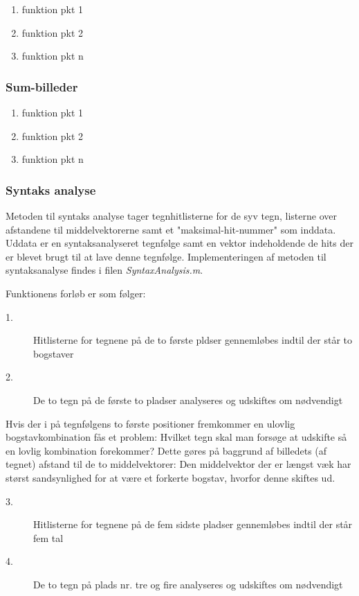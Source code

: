 \begin{enumerate}
\item funktion pkt 1
\item funktion pkt 2
\item funktion pkt n
\end{enumerate}

\subsubsection{Sum-billeder}

\begin{enumerate}
\item funktion pkt 1
\item funktion pkt 2
\item funktion pkt n
\end{enumerate}

\subsubsection{Syntaks analyse}

Metoden til syntaks analyse tager tegnhitlisterne for de syv tegn, listerne over afstandene til middelvektorerne samt et "maksimal-hit-nummer" som inddata. Uddata er en syntaksanalyseret tegnfølge samt en vektor indeholdende de hits der er blevet brugt til at lave denne tegnfølge. Implementeringen af metoden til syntaksanalyse findes i filen \textit{SyntaxAnalysis.m}.

Funktionens forløb er som følger:

\begin{description}
\item[1.] Hitlisterne for tegnene på de to første pldser gennemløbes indtil der står to bogstaver
\item[2.] De to tegn på de første to pladser analyseres og udskiftes om nødvendigt
\end{description}

Hvis der i på tegnfølgens to første positioner fremkommer en ulovlig bogstavkombination fås et problem: Hvilket tegn skal man forsøge at udskifte så en lovlig kombination forekommer? Dette gøres på baggrund af billedets (af tegnet) afstand til de to middelvektorer: Den middelvektor der er længst væk har størst sandsynlighed for at være et forkerte bogstav, hvorfor denne skiftes ud.

\begin{description}
\item[3.] Hitlisterne for tegnene på de fem sidste pladser gennemløbes indtil der står fem tal
\item[4.] De to tegn på plads nr. tre og fire analyseres og udskiftes om nødvendigt
\end{description}

